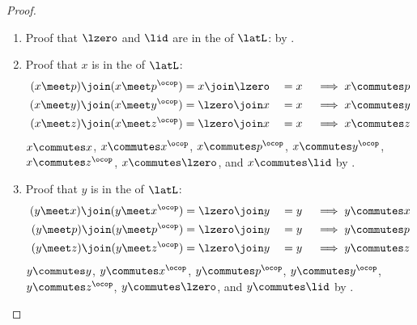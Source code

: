 \begin{example}
%
\end{example}
\begin{proof}
\begin{enumerate}
  \item Proof that $\lzero$ and $\lid$ are in the  of $\latL$: by .

  \item Proof that $x$ is in the  of $\latL$:
    \begin{align*}
      (x \meet p)       \join (x \meet p^\ocop)      &= x      \join \lzero &&= x  &&\implies x \commutes p       \\
      (x \meet y)       \join (x \meet y^\ocop)      &= \lzero \join x      &&= x  &&\implies x \commutes y       \\
      (x \meet z)       \join (x \meet z^\ocop)      &= \lzero \join x      &&= x  &&\implies x \commutes z       
    \end{align*}
    $x\commutes x$, $x\commutes x^\ocop$, $x\commutes p^\ocop$, $x\commutes y^\ocop$, $x \commutes z^\ocop$, $x\commutes\lzero$, and $x\commutes\lid$ by .

  \item Proof that $y$ is in the  of $\latL$:
    \begin{align*}
      (y \meet x)       \join (y \meet x^\ocop)      &= \lzero \join y      &&= y  &&\implies y \commutes x       \\
      (y \meet p)       \join (y \meet p^\ocop)      &= \lzero \join y      &&= y  &&\implies y \commutes p       \\
      (y \meet z)       \join (y \meet z^\ocop)      &= \lzero \join y      &&= y  &&\implies y \commutes z       
    \end{align*}
    $y\commutes y$, $y\commutes x^\ocop$, $y\commutes p^\ocop$, $y\commutes y^\ocop$, $y \commutes z^\ocop$, $y\commutes\lzero$, and $y\commutes\lid$ by .


\end{enumerate}
\end{proof}
